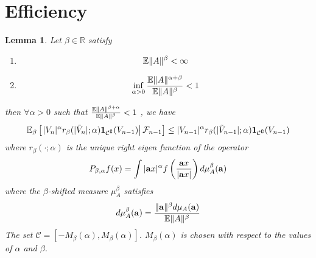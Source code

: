 \documentclass{article}
\newtheorem{lemma}{Lemma}
\theoremstyle{remark}
\begin{document}
\section{Efficiency}\label{sec:efficiency}
\begin{lemma}
  Let $\beta \in \mathbb R$ satisfy
  \begin{enumerate}
  \item
    \begin{equation}
      \label{eq:drift_cond1}
      \mathbb{E} \|A\|^\beta < \infty      
    \end{equation}
  \item 
    \begin{equation}
      \label{eq:drift_cond2}
    \inf_{\alpha > 0} {\mathbb{E} \|A\|^{\alpha + \beta}
      \over 
      \mathbb{E} \|A\|^{\beta}
    } < 1
    \end{equation}
  \end{enumerate}
  then $\forall \alpha > 0$ such that $\frac{\mathbb{E}\|A\|^{\beta +
      \alpha}}{\mathbb{E}\|A\|^\beta} < 1$ , we have
  \begin{equation}
    \label{eq:drift}
    \mathbb{E}_\beta \left[\left.
        |V_n|^\alpha r_\beta(|\tilde V_n|; \alpha) \mathbf{1}_{{\mathcal C}^\complement}(V_{n-1}) \right|
      \mathcal F_{n-1} \right] \leq |V_{n-1}|^\alpha r_\beta(|\tilde
    V_{n-1}|; \alpha) \mathbf{1}_{{\mathcal C}^\complement}(V_{n-1})
  \end{equation}
  where $r_\beta(\cdot; \alpha)$ is the unique right eigen function of the
  operator
  \[
  P_{\beta, \alpha} f(x) = \int |\mathbf a x|^\alpha f\left(
    {\mathbf a x \over |\mathbf a x|}
  \right) d\mu_A^\beta(\mathbf a)
  \]
  where the $\beta$-shifted measure $\mu_A^\beta$ satisfies
  \[
  d\mu_A^\beta(\mathbf a) = {\|\mathbf a\|^\beta d\mu_A(\mathbf a) \over \mathbb{E}\|A\|^\beta}
  \]
  The set $\mathcal C = [-M_\beta(\alpha),
  M_\beta(\alpha)]$. $M_\beta(\alpha)$ is chosen with respect to the
  values of $\alpha$ and $\beta$.
\end{lemma}
\end{document}
